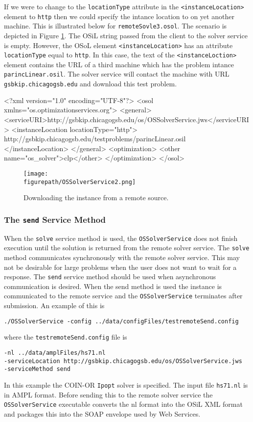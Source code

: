 \documentclass[11pt]{article}
\newcommand{\figurepath}{./figures}
\newcounter{Fig}
\renewcommand{\_}{{\char"5F}}
\renewcommand{\{}{{\char"7B}}
\renewcommand{\}}{{\char"7D}}
\renewcommand{\^}{{\char"0D}}
\renewcommand{\'}{{\char"0D}}
\begin{document}
If we were to change to the {\tt locationType} attribute in the {\tt <instanceLocation>} element to {\tt http} then we could specify the intance location to on yet another machine. This is illustrated below  for {\tt remoteSovle3.osol}.  The scenario is depicted in Figure \ref{figure:ossolverservice2}.  The OSiL string passed from the client to the solver service is empty.  However, the OSoL element {\tt <instanceLocation>}  has an attribute {\tt locationType} equal to   {\tt http}.  In this case, the text of the {\tt <instanceLoction>} element contains the URL of a third machine which has the problem intance {\tt parincLinear.osil}.  The solver service will contact the machine with URL {\tt gsbkip.chicagogsb.edu} and download this test problem. 
\begin{verbatimtab}[4]
<?xml version="1.0" encoding="UTF-8"?>
<osol xmlns="os.optimizationservices.org">
    <general>
        <serviceURI>http://gsbkip.chicagogsb.edu/os/OSSolverService.jws</serviceURI>
         <instanceLocation locationType="http">
	 http://gsbkip.chicagogsb.edu/testproblems/parincLinear.osil
	 </instanceLocation>
    </general>
    <optimization>
    	<other name="os_solver">clp</other>
    </optimization>
</osol>
\end{verbatimtab}

\begin{figure}
\centering
\texttt{[image: \\figurepath/OSSolverService2.png]}
\caption{Downloading the instance from a remote source.} 
\label{figure:ossolverservice2}
\end{figure}

\subsubsection{The  {\tt send} Service Method}\label{section:send}

When the {\tt solve} service method is used, the {\tt OSSolverService} does not finish execution until the solution is returned from the remote solver service. The {\tt solve} method communicates synchronously with the remote solver service. This may not be desirable for large problems when the user does not want to wait for a response. The {\tt send} service method should be used when asynchronous communication is desired. When the send method is used the instance is communicated to the remote service and the {\tt OSSolverService} terminates after submission. An example of this is
\begin{verbatim}
./OSSolverService -config ../data/configFiles/testremoteSend.config
\end{verbatim}
where the {\tt testremoteSend.config} file is
\begin{verbatim}
-nl ../data/amplFiles/hs71.nl
-serviceLocation http://gsbkip.chicagogsb.edu/os/OSSolverService.jws
-serviceMethod send
\end{verbatim}
In this example the COIN-OR {\tt Ipopt} solver is specified. The input file {\tt hs71.nl} is in AMPL format. Before sending this to the remote solver service the {\tt OSSolverService} executable converts  the nl format into the OSiL XML format and packages this into the SOAP envelope used by Web Services. 
\end{document}
